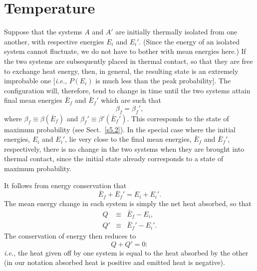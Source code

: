 \section{Temperature}\label{s5.3}
Suppose that the systems $A$ and $A'$ are initially thermally isolated from one 
another, with respective energies $E_i$ and $E_i'$. 
(Since the energy of an isolated system cannot fluctuate, we do not have to
bother with mean energies here.) If the two systems are
subsequently placed in thermal contact, so that they are
 free to exchange heat energy, then,
in general, the resulting state is an extremely improbable one
[{\em i.e.}, $P(E_i)$  is much less than the peak probability].  The configuration will,
therefore, 
tend to change in time until the two systems attain final mean energies $\bar{E}_f$
and $\bar{E}_f'$ which are such that
\begin{equation}
\beta_f = \beta_f',
\end{equation}
where
$\beta_f\equiv \beta(\bar{E}_f)$ and $\beta_f'\equiv \beta'(\bar{E}_f')$. This
corresponds to the state of maximum probability (see Sect.~\ref{s5.2}).
In the special case where the initial energies, $E_i$ and $E_i'$, lie very close to
the final mean energies, $\bar{E}_f$ and $\bar{E}_f'$, respectively, there is no
change in the two systems when they are brought into thermal contact, since the
initial state already corresponds to a state of  maximum probability.

It follows from energy conservation that
\begin{equation}
\bar{E}_f +\bar{E}_f' = E_i + E_i'.
\end{equation}
The mean energy change in each system is simply the net heat absorbed, so that
\begin{eqnarray}
Q&\equiv& \bar{E}_f - E_i,\\
Q'&\equiv&\bar{E}_f' - E_i'.
\end{eqnarray}
The conservation of energy then reduces to
\begin{equation}
Q+ Q' =0:\label{e5.21}
\end{equation}
{\em i.e.},  the heat given off by one system is equal to the heat absorbed by the other 
(in our notation absorbed
heat is positive and  emitted heat is negative).


